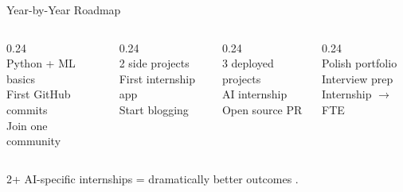 \begin{frame}{Year-by-Year Roadmap}
\vspace{0.3em}
\begin{columns}[T]
  \begin{column}{0.24\textwidth}
    \\[0.4em]
    \footnotesize
    Python + ML basics\\[2pt]
    First GitHub commits\\[2pt]
    Join one community
  \end{column}
  \begin{column}{0.24\textwidth}
    \\[0.4em]
    \footnotesize
    2 side projects\\[2pt]
    First internship app\\[2pt]
    Start blogging
  \end{column}
  \begin{column}{0.24\textwidth}
    \\[0.4em]
    \footnotesize
    3 deployed projects\\[2pt]
    AI internship\\[2pt]
    Open source PR
  \end{column}
  \begin{column}{0.24\textwidth}
    \\[0.4em]
    \footnotesize
    Polish portfolio\\[2pt]
    Interview prep\\[2pt]
    Internship $\rightarrow$ FTE
  \end{column}
\end{columns}
\vspace{0.7em}
\begin{center}
  {\small 2+ AI-specific internships = dramatically better outcomes .}\\[0.2em]
  {\footnotesize{}}
\end{center}
\end{frame}

